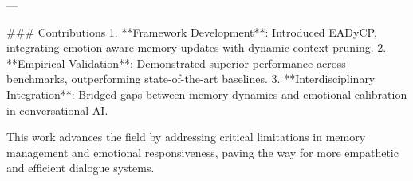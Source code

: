 ---

### Contributions
1. **Framework Development**: Introduced EADyCP, integrating emotion-aware memory updates with dynamic context pruning.
2. **Empirical Validation**: Demonstrated superior performance across benchmarks, outperforming state-of-the-art baselines.
3. **Interdisciplinary Integration**: Bridged gaps between memory dynamics and emotional calibration in conversational AI.

This work advances the field by addressing critical limitations in memory management and emotional responsiveness, paving the way for more empathetic and efficient dialogue systems.